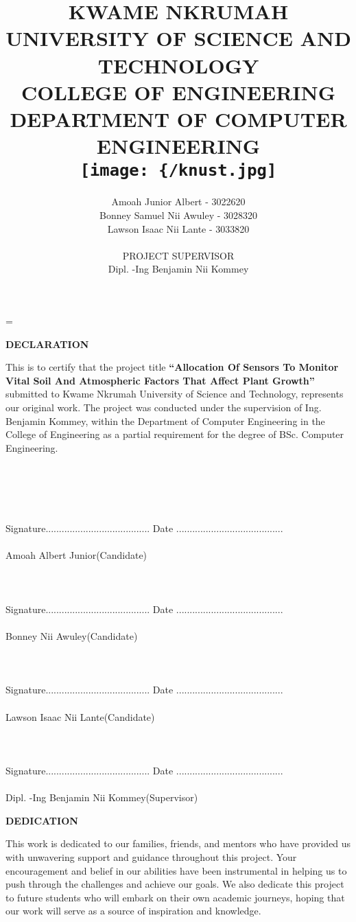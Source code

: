 =\documentclass[12pt, a4paper]{article}
\title{KWAME NKRUMAH UNIVERSITY OF SCIENCE AND TECHNOLOGY\\
COLLEGE OF ENGINEERING\\
DEPARTMENT OF COMPUTER ENGINEERING\\ 
\texttt{[image: \{/knust.jpg]}} 
\\ALLOCATION OF SENSORS TO MONITOR VITAL SOIL AND ATMOSPHERIC FACTORS THAT AFFECT PLANT GROWTH\\ Case Study: KNUST Peasant Farms}
\author{Amoah Junior Albert - 3022620\\ Bonney Samuel Nii Awuley - 3028320 \\ Lawson Isaac Nii Lante - 3033820 \\ \\ PROJECT SUPERVISOR\\ Dipl. -Ing Benjamin Nii Kommey}
\begin{document}
\maketitle
\thispagestyle{empty}
\newpage

\begin{center}
\textbf{DECLARATION}
\end{center}
This is to certify that the project title \textbf{``Allocation Of Sensors To Monitor Vital Soil And Atmospheric Factors That Affect Plant Growth''} submitted to Kwame Nkrumah University of Science and Technology, represents our original work. The project was conducted under the supervision of Ing. Benjamin Kommey, within the Department of Computer Engineering in the College of Engineering as a partial requirement for the degree of BSc. Computer Engineering.\\ \\ \\  \\ \\ \\
Signature....................................... Date ........................................\\ \\
Amoah Albert Junior(Candidate)\\ \\ \\ \\
Signature....................................... Date ........................................\\ \\
Bonney Nii Awuley(Candidate)\\ \\  \\ \\
Signature....................................... Date ........................................\\ \\
Lawson Isaac Nii Lante(Candidate)\\ \\ \\ \\
Signature....................................... Date ........................................\\ \\
Dipl. -Ing Benjamin Nii Kommey(Supervisor)
\newpage

\begin{center}
\textbf{DEDICATION}
\end{center}
This work is dedicated to our families, friends, and mentors who have provided us with unwavering support and guidance throughout this project. Your encouragement and belief in our abilities have been instrumental in helping us to push through the challenges and achieve our goals. We also dedicate this project to future students who will embark on their own academic journeys, hoping that our work will serve as a source of inspiration and knowledge.
\newpage
\end{document}
